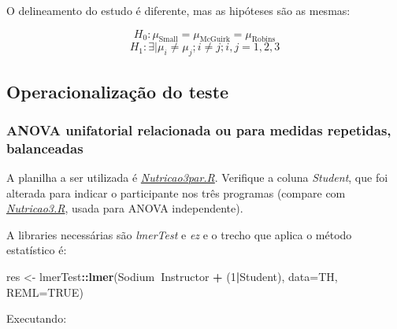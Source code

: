\documentclass[]{article}
\newenvironment{Shaded}{\begin{snugshade}}{\end{snugshade}}
\newcommand{\KeywordTok}[1]{\textcolor[rgb]{0.13,0.29,0.53}{\textbf{#1}}}
\newcommand{\DataTypeTok}[1]{\textcolor[rgb]{0.13,0.29,0.53}{#1}}
\newcommand{\DecValTok}[1]{\textcolor[rgb]{0.00,0.00,0.81}{#1}}
\newcommand{\StringTok}[1]{\textcolor[rgb]{0.31,0.60,0.02}{#1}}
\newcommand{\OtherTok}[1]{\textcolor[rgb]{0.56,0.35,0.01}{#1}}
\newcommand{\OperatorTok}[1]{\textcolor[rgb]{0.81,0.36,0.00}{\textbf{#1}}}
\newcommand{\NormalTok}[1]{#1}
\begin{document}
O delineamento do estudo é diferente, mas as hipóteses são as mesmas:

\[H_0: \mu_{\text{Small}} = \mu_{\text{McGuirk}} = \mu_{\text{Robins}}\]
\[H_1: \exists |\mu_i \ne \mu_j; i \ne j; i,j=1,2,3\]

\subsection{Operacionalização do
teste}\label{operacionalizacao-do-teste-1}

\subsubsection{ANOVA unifatorial relacionada ou para medidas repetidas,
balanceadas}\label{anova-unifatorial-relacionada-ou-para-medidas-repetidas-balanceadas}

A planilha a ser utilizada é \emph{\url{Nutricao3par.R}}. Verifique a
coluna \emph{Student}, que foi alterada para indicar o participante nos
três programas (compare com \emph{\url{Nutricao3.R}}, usada para ANOVA
independente).

A libraries necessárias são \emph{lmerTest} e \emph{ez} e o trecho que
aplica o método estatístico é:

\begin{Shaded}
\begin{Highlighting}[]
\NormalTok{res <-}\StringTok{ }\NormalTok{lmerTest}\OperatorTok{::}\KeywordTok{lmer}\NormalTok{(Sodium}\OperatorTok{~}\NormalTok{Instructor }\OperatorTok{+}\StringTok{ }\NormalTok{(}\DecValTok{1}\OperatorTok{|}\NormalTok{Student), }\DataTypeTok{data=}\NormalTok{TH, }\DataTypeTok{REML=}\OtherTok{TRUE}\NormalTok{)}
\end{Highlighting}
\end{Shaded}

Executando:
\end{document}

